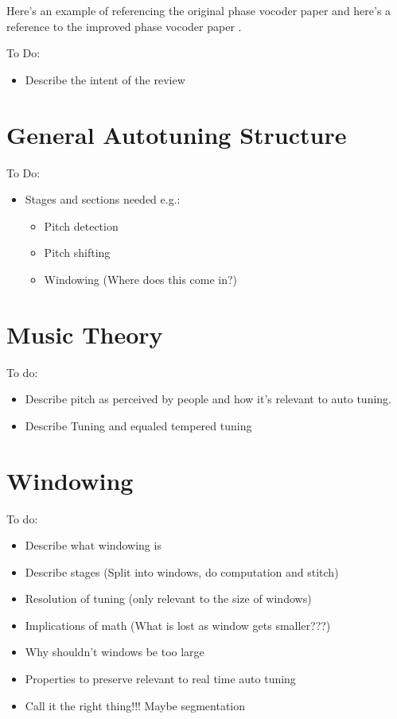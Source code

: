 
\color{red}
Here's an example of referencing the original phase vocoder paper
\cite{OriginalPhaseVocoder} and here's a reference to the improved phase
vocoder paper \cite{ImprovedPhaseVocoder}.

To Do:
\begin{itemize}
	\item Describe the intent of the review
\end{itemize}
\color{black}

\section{General Autotuning Structure}

\color{red}
To Do:
\begin{itemize}
	\item Stages and sections needed e.g.:
	\begin{itemize}
		\item Pitch detection
		\item Pitch shifting
		\item Windowing (Where does this come in?)
	\end{itemize}
\end{itemize}
\color{black}

\section{Music Theory}

\color{red}
To do:
\begin{itemize}
	\item Describe pitch as perceived by people and how it's relevant to auto tuning.
	\item Describe Tuning and equaled tempered tuning
\end{itemize}
\color{black}

\section{Windowing}

\color{red}
To do:
\begin{itemize}
	\item Describe what windowing is
	\item Describe stages (Split into windows, do computation and stitch)
	\item Resolution of tuning (only relevant to the size of windows)
	\item Implications of math (What is lost as window gets smaller???)
	\item Why shouldn't windows be too large
	\item Properties to preserve relevant to real time auto tuning
	\item Call it the right thing!!! Maybe segmentation
\end{itemize}
\color{black}


